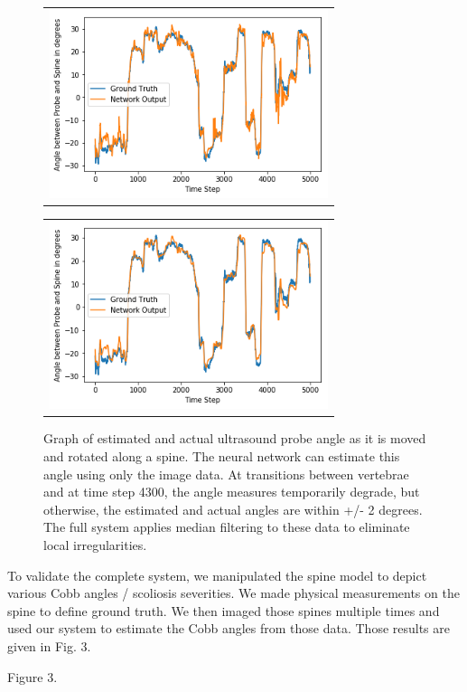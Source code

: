 \documentclass{article}
\begin{document}
\begin{figure}
\centering
\begin{tabular}{c}
\centering
\includegraphics[height=5.5cm,keepaspectratio]{NetworkOutput} 

\end{tabular}
\begin{tabular}{c}
\centering

\includegraphics[height=5.5cm,keepaspectratio]{MedFilterNetworkOutput}
\end{tabular}
\caption{Graph of estimated and actual ultrasound probe angle as it is moved and rotated along a spine.  The neural network can estimate this angle using only the image data.  At transitions between vertebrae and at time step 4300, the angle measures temporarily degrade, but otherwise, the estimated and actual angles are within +/- 2 degrees.  The full system applies median filtering to these data to eliminate local irregularities.
}
\end{figure}
 

To validate the complete system, we manipulated the spine model to depict various Cobb angles / scoliosis severities.   We made physical measurements on the spine to define ground truth.  We then imaged those spines multiple times and used our system to estimate the Cobb angles from those data.  Those results are given in Fig. 3.


Figure 3. 
\end{document}
